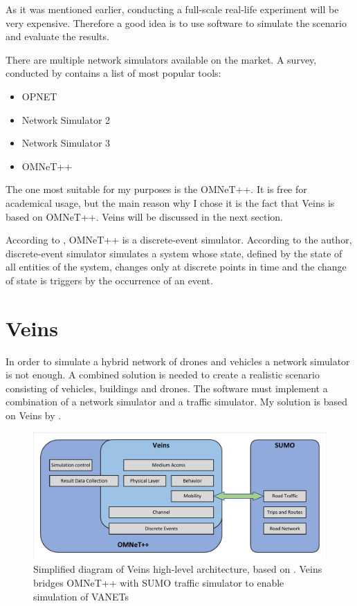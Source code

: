 \documentclass[]{nsm-thesis}
\begin{document}
As it was mentioned earlier, conducting a full-scale real-life experiment will be very expensive. Therefore a good idea is to use software to simulate the scenario and evaluate the results. 

There are multiple network simulators available on the market. A survey, conducted by \textcite{pan2008survey} contains a list of most popular tools:
\begin{itemize}
\item OPNET \cite[Page~5]{pan2008survey}
\item Network Simulator 2 \cite[Page~7]{pan2008survey}
\item Network Simulator 3 \cite[Page~8]{pan2008survey}
\item OMNeT++ \cite[Page~10]{pan2008survey}
\end{itemize}

The one most suitable for my purposes is the OMNeT++. It is free for academical usage, but the main reason why I chose it is the fact that Veins \cite{Sommer2019} is based on OMNeT++. Veins will be discussed in the next section.

According to \textcite[Page~2]{Varga2010}, OMNeT++ is a discrete-event simulator. According to the author, discrete-event simulator simulates a system whose state, defined by the state of all entities of the system, changes only at discrete points in time and the change of state is triggers by the occurrence of an event.



\section {Veins}

In order to simulate a hybrid network of drones and vehicles a network simulator is not enough. A combined solution is needed to create a realistic scenario consisting of vehicles, buildings and drones. The software must implement a combination of a network simulator and a traffic simulator. My solution is based on Veins by \textcite{Sommer2019}.

\begin{figure}
  	\centering
	\includegraphics[width=1\textwidth]{figures/VeinsHighLevel.pdf}
	\caption{Simplified diagram of Veins high-level architecture, based on \cite{Sommer2019}. Veins bridges OMNeT++ with SUMO traffic simulator to enable simulation of \acp{VANET} \cite{Sommer2019}}
	\label{fig:veinshighlevel}
\end{figure}
\end{document}
